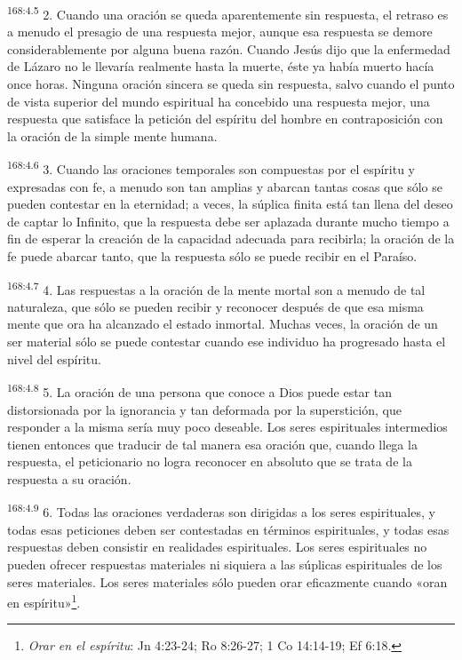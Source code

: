 \par 
\textsuperscript{168:4.5} 2. Cuando una oración se queda aparentemente sin respuesta, el retraso es a menudo el presagio de una respuesta mejor, aunque esa respuesta se demore considerablemente por alguna buena razón. Cuando Jesús dijo que la enfermedad de Lázaro no le llevaría realmente hasta la muerte, éste ya había muerto hacía once horas. Ninguna oración sincera se queda sin respuesta, salvo cuando el punto de vista superior del mundo espiritual ha concebido una respuesta mejor, una respuesta que satisface la petición del espíritu del hombre en contraposición con la oración de la simple mente humana.

\par 
\textsuperscript{168:4.6} 3. Cuando las oraciones temporales son compuestas por el espíritu y expresadas con fe, a menudo son tan amplias y abarcan tantas cosas que sólo se pueden contestar en la eternidad; a veces, la súplica finita está tan llena del deseo de captar lo Infinito, que la respuesta debe ser aplazada durante mucho tiempo a fin de esperar la creación de la capacidad adecuada para recibirla; la oración de la fe puede abarcar tanto, que la respuesta sólo se puede recibir en el Paraíso.

\par 
\textsuperscript{168:4.7} 4. Las respuestas a la oración de la mente mortal son a menudo de tal naturaleza, que sólo se pueden recibir y reconocer después de que esa misma mente que ora ha alcanzado el estado inmortal. Muchas veces, la oración de un ser material sólo se puede contestar cuando ese individuo ha progresado hasta el nivel del espíritu.

\par 
\textsuperscript{168:4.8} 5. La oración de una persona que conoce a Dios puede estar tan distorsionada por la ignorancia y tan deformada por la superstición, que responder a la misma sería muy poco deseable. Los seres espirituales intermedios tienen entonces que traducir de tal manera esa oración que, cuando llega la respuesta, el peticionario no logra reconocer en absoluto que se trata de la respuesta a su oración.

\par 
\textsuperscript{168:4.9} 6. Todas las oraciones verdaderas son dirigidas a los seres espirituales, y todas esas peticiones deben ser contestadas en términos espirituales, y todas esas respuestas deben consistir en realidades espirituales. Los seres espirituales no pueden ofrecer respuestas materiales ni siquiera a las súplicas espirituales de los seres materiales. Los seres materiales sólo pueden orar eficazmente cuando «oran en espíritu»\footnote{\textit{Orar en el espíritu}: Jn 4:23-24; Ro 8:26-27; 1 Co 14:14-19; Ef 6:18.}.

